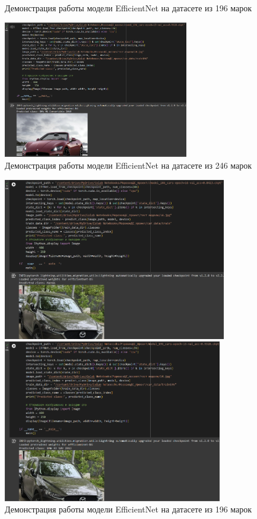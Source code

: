 \documentclass[14pt]{extarticle}
\begin{document}
\begin{figure}[H]
\begin{minipage}{0.49\textwidth}
  \caption{Демонстрация работы модели \foreignlanguage{english}{EfficientNet} на датасете из 196 марок}
  \label{fig:12}
\end{minipage}
\hfill
\begin{minipage}{0.49\textwidth}
  \centering
  \includegraphics[height=6cm]{images/25.png}  
  \caption{Демонстрация работы модели \foreignlanguage{english}{EfficientNet} на датасете из 246 марок}
  \label{fig:13}
\end{minipage}
\end{figure}\begin{figure}[H]
\centering
\begin{minipage}{0.49\textwidth}
  \centering
  \includegraphics[height=7.1cm]{images/26.png}  
  \caption{Демонстрация работы модели \foreignlanguage{english}{EfficientNet} на датасете из 196 марок}
  \label{fig:12}
\end{minipage}
\hfill
\begin{minipage}{0.49\textwidth}
  \centering
  \includegraphics[height=7.1cm]{images/27.png}  

\end{minipage}
\end{figure}
\end{document}
